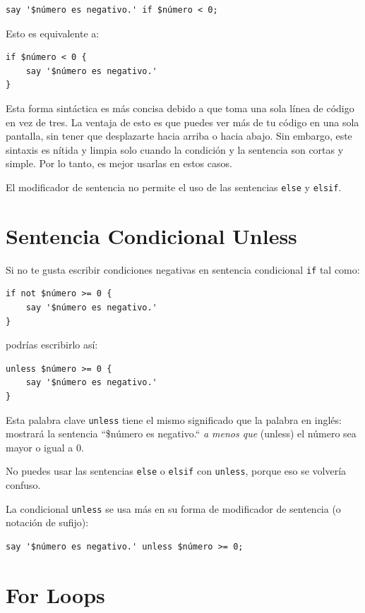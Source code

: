 \begin{lstlisting}
say '$número es negativo.' if $número < 0;
\end{lstlisting}
%
Esto es equivalente a:
\begin{lstlisting}
if $número < 0 {
    say '$número es negativo.' 
}
\end{lstlisting}
%
Esta forma sintáctica es más concisa debido a que toma
una sola línea de código en vez de tres. La ventaja de esto
es que puedes ver más de tu código en una sola pantalla,
sin tener que desplazarte hacia arriba o hacia abajo. 
Sin embargo, este sintaxis es nítida y limpia solo cuando
la condición y la sentencia son cortas y simple. Por lo
tanto, es mejor usarlas en estos casos.

El modificador de sentencia no permite el uso de las
sentencias {\tt else} y {\tt elsif}.

\section{Sentencia Condicional Unless}

Si no te gusta escribir condiciones negativas en sentencia
condicional {\tt if} tal como:
%
\begin{lstlisting}
if not $número >= 0 {
    say '$número es negativo.' 
}
\end{lstlisting}
%

podrías escribirlo así:

\begin{lstlisting}
unless $número >= 0 {
    say '$número es negativo.' 
}
\end{lstlisting}
%
Esta palabra clave \verb|unless| tiene el mismo significado
que la palabra en inglés: mostrará la sentencia ``\$número es negativo.``
\emph{a menos que} (unless) el número sea mayor o igual a 0.

No puedes usar las sentencias {\tt else} o {\tt elsif} con 
{\tt unless}, porque eso se volvería confuso.

La condicional {\tt unless} se usa más en su forma 
de modificador de sentencia (o notación de sufijo):
 
 

\begin{lstlisting}
say '$número es negativo.' unless $número >= 0;
\end{lstlisting}
%

\section{For Loops}
\label{for_loops}

